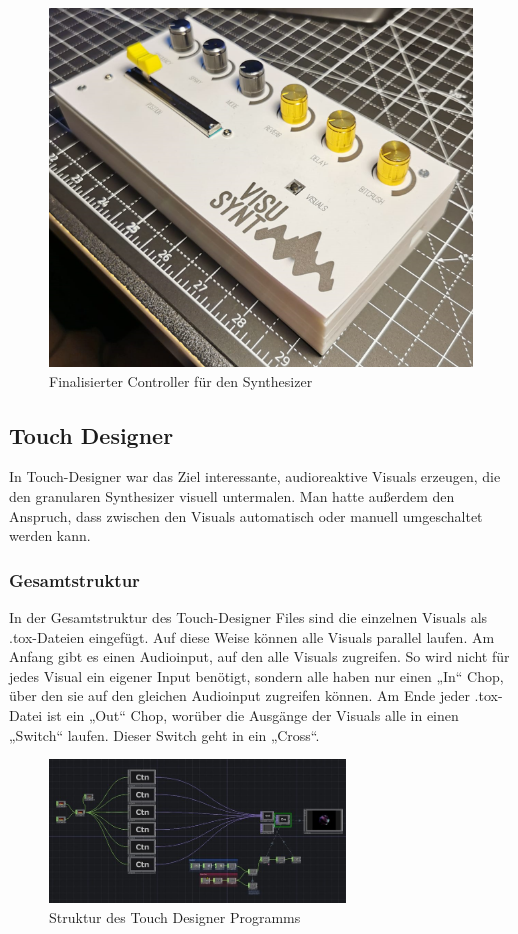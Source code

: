 \documentclass[12pt]{scrartcl}%
\theoremstyle{nonumberplain}
\begin{document}
\begin{figure}[h]
\centering
  \includegraphics[scale=0.5]{hw_3}
  \caption{Finalisierter Controller für den Synthesizer}
\end{figure}

\newpage

\subsection{Touch Designer}

In Touch-Designer war das Ziel interessante, audioreaktive Visuals erzeugen, die den granularen Synthesizer visuell untermalen. Man hatte außerdem den Anspruch, dass zwischen den Visuals automatisch oder manuell umgeschaltet werden kann.

\subsubsection{Gesamtstruktur}

In der Gesamtstruktur des Touch-Designer Files sind die einzelnen Visuals als .tox-Dateien eingefügt. Auf diese Weise können alle Visuals parallel laufen. Am Anfang gibt es einen Audioinput, auf den alle Visuals zugreifen. So wird nicht für jedes Visual ein eigener Input benötigt, sondern alle haben nur einen „In“ Chop, über den sie auf den gleichen Audioinput zugreifen können. Am Ende jeder .tox-Datei ist ein „Out“ Chop, worüber die Ausgänge der Visuals alle in einen „Switch“ laufen. Dieser Switch geht in ein „Cross“.
\begin{figure}
  \centering
  \includegraphics[width=0.7\textwidth]{td_1}
  \caption{Struktur des Touch Designer Programms}
\end{figure}
\end{document}
